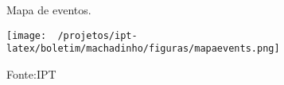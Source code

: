 
\begin{figure}[h]
    \centering
	\captionsetup{justification=raggedright, singlelinecheck=false, width=1\textwidth}
    \caption{Mapa de eventos.}
    \texttt{[image: ~/projetos/ipt-latex/boletim/machadinho/figuras/mapaevents.png]}
    \caption*{Fonte:IPT}
\end{figure}
